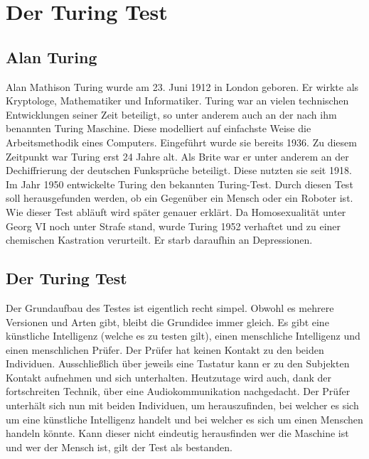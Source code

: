 %
%
%
%

\chapter{Der Turing Test}

\section{Alan Turing}
Alan Mathison Turing wurde am 23. Juni 1912 in London geboren. Er wirkte als Kryptologe, Mathematiker und Informatiker. Turing war an vielen technischen Entwicklungen seiner Zeit beteiligt, so unter anderem auch an der nach ihm benannten Turing Maschine. Diese modelliert auf einfachste Weise die Arbeitsmethodik eines Computers. Eingeführt wurde sie bereits 1936. Zu diesem Zeitpunkt war Turing erst 24 Jahre alt. Als Brite war er unter anderem an der Dechiffrierung der deutschen Funksprüche beteiligt. Diese nutzten sie seit 1918. Im Jahr 1950 entwickelte Turing den bekannten Turing-Test. Durch diesen Test soll herausgefunden werden, ob ein Gegenüber ein Mensch oder ein Roboter ist. Wie dieser Test abläuft wird später genauer erklärt. Da Homosexualität unter Georg VI noch unter Strafe stand, wurde Turing 1952 verhaftet und zu einer chemischen Kastration verurteilt. Er starb daraufhin an  Depressionen. ~\cite{Turing_Leben}

\section{Der Turing Test}
Der Grundaufbau des Testes ist eigentlich recht simpel. Obwohl es mehrere Versionen und Arten gibt, bleibt die Grundidee immer gleich. Es gibt eine künstliche Intelligenz (welche es zu testen gilt), einen menschliche Intelligenz und einen menschlichen Prüfer. Der Prüfer hat keinen Kontakt zu den beiden Individuen. Ausschließlich über jeweils eine Tastatur kann er zu den Subjekten Kontakt aufnehmen und sich unterhalten. Heutzutage wird auch, dank der fortschreiten Technik, über eine Audiokommunikation nachgedacht. Der Prüfer unterhält sich nun mit beiden Individuen, um herauszufinden, bei welcher es sich um eine künstliche Intelligenz handelt und bei welcher es sich um einen Menschen handeln könnte. Kann dieser nicht eindeutig herausfinden wer die Maschine ist und wer der Mensch ist, gilt der Test als bestanden. ~\cite{gregorlüdi/martinlüscher20077}

